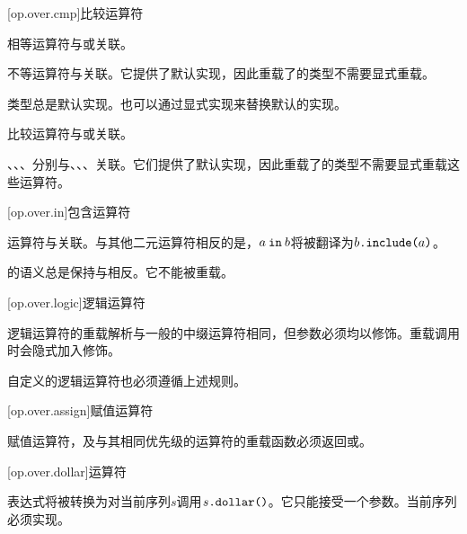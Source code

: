 [op.over.cmp]{比较运算符}

\pnum
相等运算符\tcode{==}与或关联。

\pnum
不等运算符\tcode{!=}与关联。它提供了默认实现，因此重载了\tcode{==}的类型不需要显式重载\tcode{!=}。

\pnum
类型总是默认实现。也可以通过显式实现来替换默认的实现。

\pnum
比较运算符与或关联。

\pnum
\tcode{<}、\tcode{<=}、\tcode{>}、\tcode{>=}分别与、、、关联。它们提供了默认实现，因此重载了的类型不需要显式重载这些运算符。

[op.over.in]{包含运算符}

\pnum
{}运算符与关联。与其他二元运算符相反的是，$a\mathbin{\texttt{in}}b$将被翻译为$b\texttt{.include(}a\texttt{)}$。

\pnum
{}的语义总是保持与相反。它不能被重载。

[op.over.logic]{逻辑运算符}

\pnum
逻辑运算符的重载解析与一般的中缀运算符相同，但参数必须均以修饰。重载调用时会隐式加入修饰。

\pnum
自定义的逻辑运算符也必须遵循上述规则。

[op.over.assign]{赋值运算符}

\pnum
赋值运算符，及与其相同优先级的运算符的重载函数必须返回或。

[op.over.dollar]{\tcode{\$}运算符}

\pnum
\tcode{\$}表达式将被转换为对当前序列$s$调用$s\texttt{.dollar()}$。它只能接受一个参数。当前序列必须实现。
